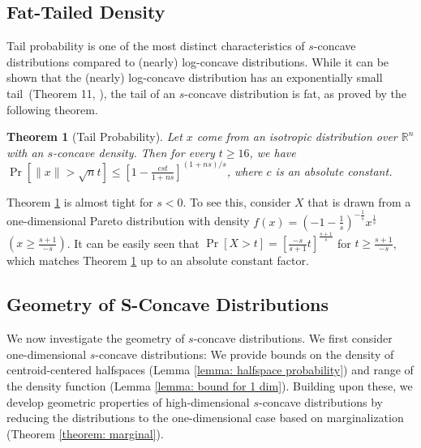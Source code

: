 \documentclass[11pt]{article}
\newcommand{\R}{\mathbb{R}}
\newtheorem{theorem}{Theorem}
\begin{document}
\subsection{Fat-Tailed Density}
Tail probability is one of the most distinct characteristics of $s$-concave distributions compared to (nearly) log-concave distributions. While it can be shown that the (nearly) log-concave distribution has an exponentially small tail~(Theorem 11, \cite{balcan2013active}), the tail of an $s$-concave distribution is fat, as proved by the following theorem.
\begin{theorem}[Tail Probability]
\label{theorem: tail probability}
Let $x$ come from an isotropic distribution over $\R^n$ with an $s$-concave density. Then for every $t\ge 16$, we have
$\Pr[\|x\|>\sqrt{n}t]\le \left[1-\frac{cst}{1+ns}\right]^{(1+ns)/s}$,
where $c$ is an absolute constant.
\end{theorem}


Theorem \ref{theorem: tail probability} is almost tight for $s<0$. To see this, consider $X$ that is drawn from a one-dimensional Pareto distribution with density $f(x)=(-1-\frac{1}{s})^{-\frac{1}{s}}x^{\frac{1}{s}}$ $(x\ge \frac{s+1}{-s})$. It can be easily seen that $\Pr[X>t]=\left[\frac{-s}{s+1}t\right]^{\frac{s+1}{s}}$ for $t\ge \frac{s+1}{-s}$, which matches Theorem \ref{theorem: tail probability} up to an absolute constant factor.


\subsection{Geometry of S-Concave Distributions}
We now investigate the geometry of $s$-concave distributions. We first consider one-dimensional $s$-concave distributions: We provide bounds on the density of centroid-centered halfspaces (Lemma \ref{lemma: halfspace probability}) and range of the density function (Lemma \ref{lemma: bound for 1 dim}). Building upon these, we develop geometric properties of high-dimensional $s$-concave distributions by reducing the distributions to the one-dimensional case based on marginalization (Theorem \ref{theorem: marginal}).
\end{document}
